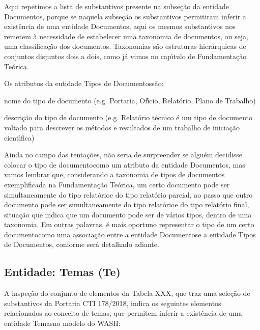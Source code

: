 \documentclass[
12pt,		%
openright,	%
twoside,  %
a4paper,			%
chapter=TITLE,		%
english,			%
french,				%
spanish,			%
brazil				%
]{USPSC-classe/USPSC}
\begin{document}
Aqui repetimos a lista de substantivos presente na subse\c{c}\~ao da entidade \textquotedbl Documentos\textquotedbl , porque se naquela subse\c{c}\~ao os substantivos permitiram inferir a exist\^encia de uma entidade \textquotedbl Documentos\textquotedbl , aqui os mesmos substantivos nos remetem \`a necessidade de estabelecer uma taxonomia de documentos, ou seja, uma classifica\c{c}\~ao dos documentos. Taxonomias s\~ao estruturas hier\'arquicas de conjuntos disjuntos dois a dois, como j\'a vimos no cap\'{\i}tulo de Fundamenta\c{c}\~ao Te\'orica.




Os atributos da entidade \textquotedbl Tipos de Documentos\textquotedbl  s\~ao:





\begin{alineas}
\item nome do tipo de documento (e.g. Portaria, Of\'{\i}cio, Relat\'orio, Plano de Trabalho)
\item descri\c{c}\~ao do tipo de documento (e.g. \textquotedbl Relat\'orio t\'ecnico \'e um tipo de documento voltado para descrever os m\'etodos e resultados de um trabalho de inicia\c{c}\~ao cient\'{\i}fica\textquotedbl )
\end{alineas}

Ainda no campo das \textquotedbl tenta\c{c}\~oes\textquotedbl , n\~ao seria de surpreender se algu\'em decidisse colocar o \textquotedbl tipo de documento\textquotedbl  como um atributo da entidade \textquotedbl Documentos\textquotedbl , mas vamos lembrar que, considerando a taxonomia de tipos de documentos exemplificada na Fundamenta\c{c}\~ao Te\'orica, um certo documento pode ser simultaneamente do tipo \textquotedbl relat\'orio\textquotedbl  e do tipo \textquotedbl relat\'orio parcial\textquotedbl , ao passo que outro documento pode ser simultaneamente do tipo \textquotedbl relat\'orio\textquotedbl  e do tipo \textquotedbl relat\'orio final\textquotedbl , situa\c{c}\~ao que indica que um documento pode ser de v\'arios tipos, dentro de uma taxonomia. Em outras palavras, \'e mais oportuno representar o \textquotedbl tipo de um certo documento\textquotedbl  como uma associa\c{c}\~ao entre a entidade \textquotedbl Documentos\textquotedbl  e a entidade \textquotedbl Tipos de Documentos\textquotedbl , conforme ser\'a detalhado adiante.




\subsection[Entidade: Temas (Te)]{Entidade: Temas (Te)}\label{Entidade: Temas (Te)}
A inspe\c{c}\~ao do conjunto de elementos da Tabela XXX, que traz uma sele\c{c}\~ao de substantivos da Portaria CTI 178/2018, indica os seguintes elementos relacionados ao conceito de \textquotedbl temas\textquotedbl , que permitem inferir a exist\^encia de uma entidade \textquotedbl Temas\textquotedbl  no modelo do WASH:
\end{document}
